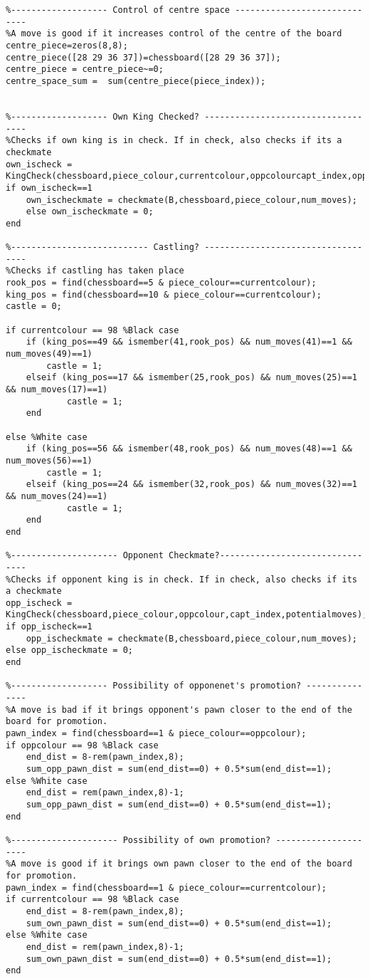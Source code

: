 \documentclass{article}
\begin{document}
\begin{lstlisting}
%------------------- Control of centre space -----------------------------
%A move is good if it increases control of the centre of the board
centre_piece=zeros(8,8);
centre_piece([28 29 36 37])=chessboard([28 29 36 37]);
centre_piece = centre_piece~=0;
centre_space_sum =  sum(centre_piece(piece_index));


%------------------- Own King Checked? -----------------------------------
%Checks if own king is in check. If in check, also checks if its a checkmate
own_ischeck = KingCheck(chessboard,piece_colour,currentcolour,oppcolourcapt_index,oppcolourpotentialmoves);
if own_ischeck==1
    own_ischeckmate = checkmate(B,chessboard,piece_colour,num_moves);
    else own_ischeckmate = 0;
end

%--------------------------- Castling? -----------------------------------
%Checks if castling has taken place
rook_pos = find(chessboard==5 & piece_colour==currentcolour);
king_pos = find(chessboard==10 & piece_colour==currentcolour);
castle = 0;

if currentcolour == 98 %Black case
    if (king_pos==49 && ismember(41,rook_pos) && num_moves(41)==1 && num_moves(49)==1)
        castle = 1;
    elseif (king_pos==17 && ismember(25,rook_pos) && num_moves(25)==1 && num_moves(17)==1)
            castle = 1;
    end
    
else %White case
    if (king_pos==56 && ismember(48,rook_pos) && num_moves(48)==1 && num_moves(56)==1)
        castle = 1;
    elseif (king_pos==24 && ismember(32,rook_pos) && num_moves(32)==1 && num_moves(24)==1)
            castle = 1;
    end
end

%--------------------- Opponent Checkmate?--------------------------------
%Checks if opponent king is in check. If in check, also checks if its a checkmate
opp_ischeck = KingCheck(chessboard,piece_colour,oppcolour,capt_index,potentialmoves);
if opp_ischeck==1
    opp_ischeckmate = checkmate(B,chessboard,piece_colour,num_moves);
else opp_ischeckmate = 0;
end   

%------------------- Possibility of opponenet's promotion? ---------------
%A move is bad if it brings opponent's pawn closer to the end of the board for promotion.
pawn_index = find(chessboard==1 & piece_colour==oppcolour);
if oppcolour == 98 %Black case
    end_dist = 8-rem(pawn_index,8);
    sum_opp_pawn_dist = sum(end_dist==0) + 0.5*sum(end_dist==1);
else %White case
    end_dist = rem(pawn_index,8)-1; 
    sum_opp_pawn_dist = sum(end_dist==0) + 0.5*sum(end_dist==1);
end

%--------------------- Possibility of own promotion? ---------------------
%A move is good if it brings own pawn closer to the end of the board for promotion.
pawn_index = find(chessboard==1 & piece_colour==currentcolour);
if currentcolour == 98 %Black case
    end_dist = 8-rem(pawn_index,8);
    sum_own_pawn_dist = sum(end_dist==0) + 0.5*sum(end_dist==1);
else %White case
    end_dist = rem(pawn_index,8)-1; 
    sum_own_pawn_dist = sum(end_dist==0) + 0.5*sum(end_dist==1);
end


\end{lstlisting}
\end{document}
